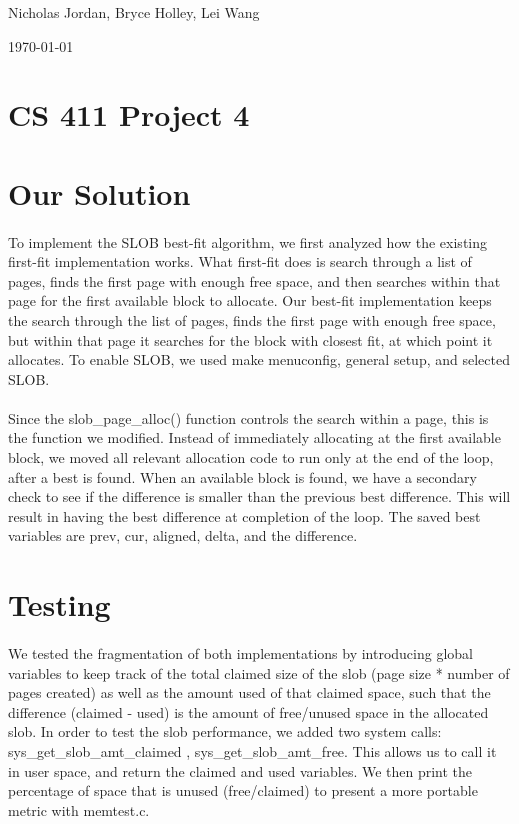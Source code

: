 \documentclass[letterpaper,10pt]{article}
\def\name{Nicholas Jordan, Bryce Holley, Lei Wang}
\begin{document}
\hfill \name

\hfill \today

\section*{CS 411 Project 4}
\section*{Our Solution}
\paragraph{} 
To implement the SLOB best-fit algorithm, we first analyzed how the existing first-fit implementation works. What first-fit does is search through a list of pages, finds the first page with enough free space, and then searches within that page for the first available block to allocate. Our best-fit implementation keeps the search through the list of pages, finds the first page with enough free space, but within that page it searches for the block with closest fit, at which point it allocates. To enable SLOB, we used make menuconfig, general setup, and selected SLOB.

\paragraph{} 
Since the slob\_page\_alloc() function controls the search within a page, this is the function we modified. Instead of immediately allocating at the first available block, we moved all relevant allocation code to run only at the end of the loop, after a best is found. When an available block is found, we have a secondary check to see if the difference is smaller than the previous best difference. This will result in having the best difference at completion of the loop. The saved best variables are prev, cur, aligned, delta, and the difference.

\section*{Testing}
\paragraph{} 
We tested the fragmentation of both implementations by introducing global variables to keep track of the total claimed size of the slob (page size * number of pages created) as well as the amount used of that claimed space, such that the difference (claimed - used) is the amount of free/unused space in the allocated slob. In order to test the slob performance, we added two system calls: sys\_get\_slob\_amt\_claimed , sys\_get\_slob\_amt\_free. This allows us to call it in user space, and return the claimed and used variables. We then print the percentage of space that is unused (free/claimed) to present a more portable metric with memtest.c.
\end{document}

